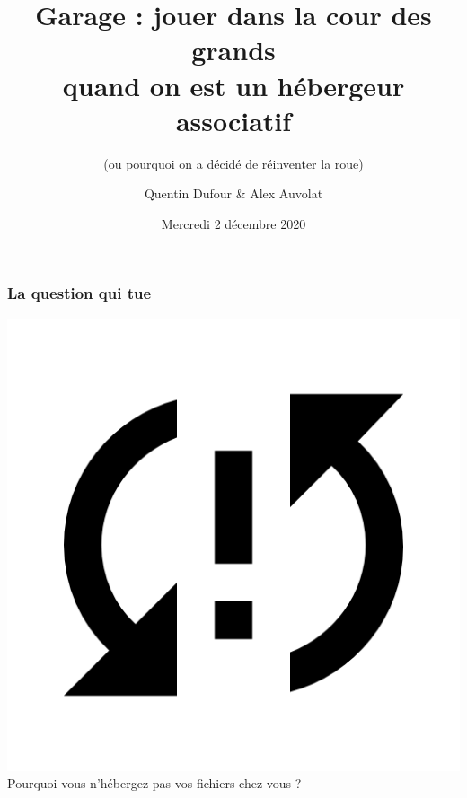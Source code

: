 \documentclass[aspectratio=169]{beamer}
\title[Garage : jouer dans la cour des grands quand on est un hébergeur associatif]{Garage : jouer dans la cour des grands \\quand on est un hébergeur associatif}
\subtitle{(ou pourquoi on a décidé de réinventer la roue)}
\author[Q. Dufour \& A. Auvolat]{Quentin Dufour \& Alex Auvolat}
\date[02/12/2020]{Mercredi 2 décembre 2020}
\begin{document}
\begin{frame}
	\titlepage
\end{frame}

\begin{frame}
	\frametitle{La question qui tue}
	
	\begin{center}
		\includegraphics[scale=3]{img/sync.png} \\
		\Huge Pourquoi vous n'hébergez pas vos fichiers chez vous ? \\
	\end{center}

\end{frame}
\end{document}
